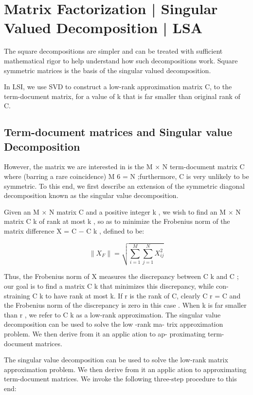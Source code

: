 \section{Matrix Factorization | Singular Valued Decomposition | LSA }
The square decompositions are simpler and can be treated with sufficient mathematical rigor to help understand how such decompositions work. Square symmetric matrices is the basis of the singular valued decomposition.

In LSI, we use SVD to construct a low-rank approximation matrix C, to the term-document matrix, for a value of k that is far smaller than original rank of C. 

\subsection{Term-document matrices and Singular value Decomposition}
However, the matrix we are interested in is the M × N term-document matrix C where (barring a rare coincidence) M 6 = N ;furthermore, C is very unlikely to be symmetric. To this end, we first describe an extension of the symmetric diagonal decomposition known as the singular value decomposition.

Given an M × N matrix C and  a positive  integer k , we  wish  to  find  an M $\times$ N matrix C k of rank at most k , so as to minimize the Frobenius norm of the matrix difference X = C − C k , defined to be:

\[
    \| X_{F} \| = \sqrt{\sum_{i=1}^{M} \sum_{j=1}^{N} X_{ij}^2}
\]

Thus, the Frobenius norm of X measures the discrepancy between C k and C ; our goal is to find a matrix C k that minimizes this discrepancy, while con- straining C k to have rank at most k. If r is the  rank of C, clearly C r = C and the Frobenius norm of the discrepancy is zero in this case . When k is far smaller than r , we refer to C k as a low-rank approximation. The singular value decomposition can be used to solve the low -rank ma- trix approximation problem.   We then derive from it an applic ation to ap- proximating term-document matrices.

The singular value decomposition can be used to solve the low-rank matrix approximation problem. We then derive from it an applic ation to approximating term-document matrices. We invoke the following three-step procedure to this end:

